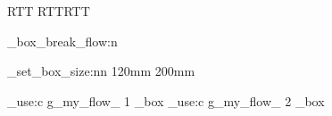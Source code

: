 \documentclass{article}
\begin{document}
\bodydir RTT \pardir RTT\textdir RTT\relax

\ExplSyntaxOn

\textbf{\thepage}

\my_box_break_flow:n { \textbf{\thepage} \lipsum[1] \par \textbf{\thepage} \lipsum[2] \textbf{\thepage} }

\my_set_box_size:nn { 120mm } { 200mm }

\lipsum[2]
\par

\box_use:c { g_my_flow_ 1 _box }
\box_use:c { g_my_flow_ 2 _box }

\par
\lipsum[1] 

\textbf{\thepage} 

\ExplSyntaxOff
\end{document}
